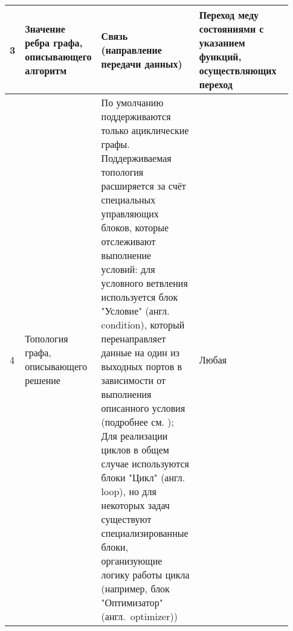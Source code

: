 \begin{landscape}
\begin{longtable}{|p{0.03\linewidth}|p{0.2\linewidth}|p{0.35\linewidth}|p{0.35\linewidth}|}
        \hline
        3          & Значение ребра графа, описывающего алгоритм                                                & Связь (направление передачи данных)                                                                                                                                                                                                                                                                                                                                                                                                                                                                                                                                                                                                                                & Переход меду состояниями с указанием функций, осуществляющих переход                                                                                                                                                                                                                             \\
        \hline
        4          & Топология графа, описывающего решение                                                      & По умолчанию поддерживаются только ациклические графы. Поддерживаемая топология расширяется за счёт специальных управляющих блоков, которые отслеживают выполнение условий: для условного ветвления используется блок "Условие" (англ. condition), который перенаправляет данные на один из выходных портов в зависимости от выполнения описанного условия (подробнее см. \cite{pSevenDocsConditons2022}); Для реализации циклов в общем случае используются блоки "Цикл" (англ. loop)\cite{pSevenDocsWorkflow2021}, но для некоторых задач существуют специализированные блоки, организующие логику работы цикла (например, блок "Оптимизатор" (англ.~optimizer)) & Любая                                                                                                                                                                                                                                                                                            \\
        \hline

\end{longtable}
\end{landscape}
